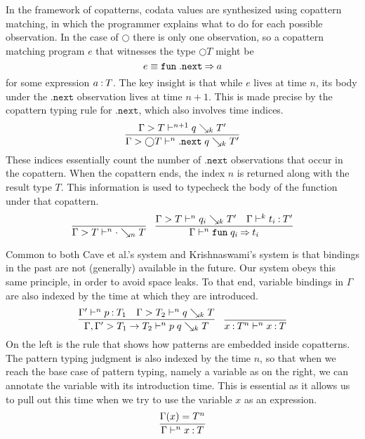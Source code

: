 \documentclass[acmsmall, natbib=false]{acmart}
\newcommand{\fun}{\mathtt{fun}}
\renewcommand{\circle}{\bigcirc}
\renewcommand{\next}{\mathtt{.next}}
\renewcommand{\synth}{\searrow}
\begin{document}
In the framework of copatterns, codata values are synthesized using copattern
matching, in which the programmer explains what to do for each possible
observation.
In the case of $\circle$ there is only one observation, so a copattern matching
program $e$ that witnesses the type $\circle T$ might be
%
\begin{equation*}
  e \equiv \fun\;\next\goesto a
\end{equation*}
%
for some expression $a \mathbin{:} T$.
The key insight is that while $e$ lives at time $n$, its body under the $\next$
observation lives at time $n+1$.
This is made precise by the copattern typing rule for $\next$, which also
involves time indices.
%
\begin{equation*}
  \infer{
    \Gamma > \circle T \proves^n \next\; q \synth_k T^\prime
  }{
    \Gamma > T \proves^{n+1} q \synth_k T^\prime
  }
\end{equation*}
%
These indices essentially count the number of $\next$ observations that occur
in the copattern.
When the copattern ends, the index $n$ is returned along with the result type
$T$. This information is used to typecheck the body of the function under that
copattern.
%
\begin{equation*}
  \infer{\Gamma > T \proves^n \cdot \synth_n T}{}
  \quad
  \infer{
    \Gamma \proves^n \fun\; q_i \goesto t_i
  }{
    \Gamma > T \proves^n q_i \synth_k T^\prime
    &
    \Gamma \proves^k t_i \hastype T^\prime
  }
\end{equation*}

Common to both Cave et al.'s system and Krishnaswami's system is that bindings
in the past are not (generally) available in the future.
Our system obeys this same principle, in order to avoid space leaks.
To that end, variable bindings in $\Gamma$ are also indexed by the time at
which they are introduced.
%
\begin{equation*}
  \infer{
    \Gamma, \Gamma^\prime > T_1 \to T_2 \proves^n p\; q \synth_k T
  }{
    \Gamma^\prime \proves^n p \hastype T_1
    &
    \Gamma > T_2 \proves^n q \synth_k T
  }
  \quad
  \infer{
    x \hastype T^n \proves^n x \hastype T
  }{}
\end{equation*}
%
On the left is the rule that shows how patterns are embedded inside copatterns.
The pattern typing judgment is also indexed by the time $n$, so that when we
reach the base case of pattern typing, namely a variable as on the right, we
can annotate the variable with its introduction time.
%
This is essential as it allows us to pull out this time when we try to use the
variable $x$ as an expression.
%
\begin{equation*}
  \infer{
    \Gamma \proves^n x \hastype T
  }{
    \Gamma(x) = T^n
  }
\end{equation*}
\end{document}
